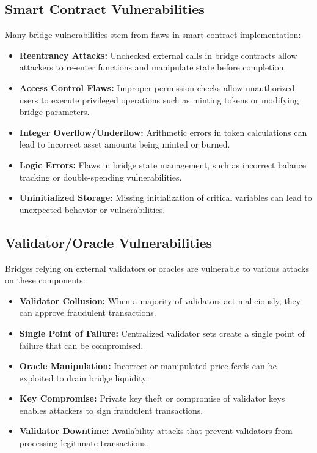 \documentclass[runningheads]{llncs}
\begin{document}
\subsection{Smart Contract Vulnerabilities}
Many bridge vulnerabilities stem from flaws in smart contract implementation:

\begin{itemize}
    \item \textbf{Reentrancy Attacks:} Unchecked external calls in bridge contracts allow attackers to re-enter functions and manipulate state before completion.
    
    \item \textbf{Access Control Flaws:} Improper permission checks allow unauthorized users to execute privileged operations such as minting tokens or modifying bridge parameters.
    
    \item \textbf{Integer Overflow/Underflow:} Arithmetic errors in token calculations can lead to incorrect asset amounts being minted or burned.
    
    \item \textbf{Logic Errors:} Flaws in bridge state management, such as incorrect balance tracking or double-spending vulnerabilities.
    
    \item \textbf{Uninitialized Storage:} Missing initialization of critical variables can lead to unexpected behavior or vulnerabilities.
\end{itemize}

\subsection{Validator/Oracle Vulnerabilities}
Bridges relying on external validators or oracles are vulnerable to various attacks on these components:

\begin{itemize}
    \item \textbf{Validator Collusion:} When a majority of validators act maliciously, they can approve fraudulent transactions.
    
    \item \textbf{Single Point of Failure:} Centralized validator sets create a single point of failure that can be compromised.
    
    \item \textbf{Oracle Manipulation:} Incorrect or manipulated price feeds can be exploited to drain bridge liquidity.
    
    \item \textbf{Key Compromise:} Private key theft or compromise of validator keys enables attackers to sign fraudulent transactions.
    
    \item \textbf{Validator Downtime:} Availability attacks that prevent validators from processing legitimate transactions.
\end{itemize}
\end{document}
